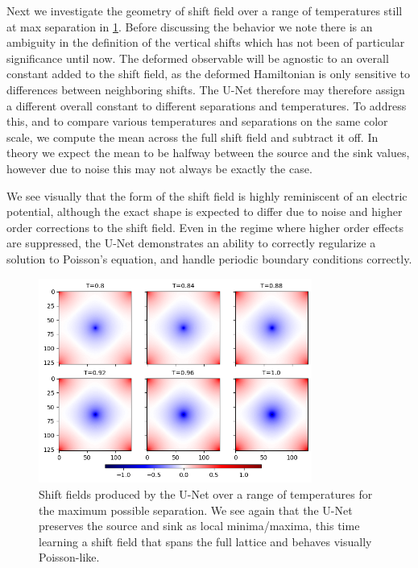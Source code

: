 \documentclass[12pt]{article}
\begin{document}
Next we investigate the geometry of shift field over a range of temperatures still at max separation in \ref{fig:unet_max_shifts}. Before discussing the behavior we note 
there is an ambiguity in the definition of the vertical shifts which has not been of particular significance until now. The deformed observable will be agnostic to 
an overall constant added to the shift field, as the deformed Hamiltonian is only sensitive to differences between neighboring shifts. The U-Net therefore may therefore 
assign a different overall constant to different separations and temperatures. To address this, and to compare various temperatures and separations on the same color scale, 
we compute the mean across the full shift field and subtract it off. In theory we expect the mean to be halfway between the source and the sink values, however due to
noise this may not always be exactly the case.

We see visually that the form of the shift field is highly reminiscent of an electric potential, although the exact shape is expected to differ due to noise and higher
order corrections to the shift field. Even in the regime where higher order effects are suppressed, the U-Net demonstrates an ability to
correctly regularize a solution to Poisson's equation, and handle periodic boundary conditions correctly.

\begin{figure}
	\centering
	\includegraphics[width=0.8\textwidth]{figures/unet_max_shifts.png}
	\caption[U-Net Max Shifts]{Shift fields produced by the U-Net over a range of temperatures for the maximum possible separation. We see again
	that the U-Net preserves the source and sink as local minima/maxima, this time learning a shift field that spans the full lattice and behaves
	visually Poisson-like.}
	\label{fig:unet_max_shifts}
\end{figure}
\end{document}
